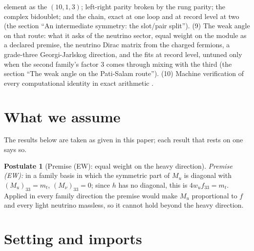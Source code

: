 \documentclass[11pt]{article}
\theoremstyle{definition}
\newtheorem{postulate}[theorem]{Postulate}
\theoremstyle{plain}
\begin{document}
element as the $(10,1,3)$; left-right parity broken by the rung parity; the complex bidoublet; and the chain, exact at one loop and at record level at two (the section ``An intermediate symmetry: the slot/pair split''). (9) The weak angle on that route: what it asks of the neutrino sector, equal weight on the module as a declared premise, the neutrino Dirac matrix from the charged fermions, a grade-three Georgi-Jarlskog direction, and the fits at record level, untuned only when the second family's factor $3$ comes through mixing with the third (the section ``The weak angle on the Pati-Salam route''). (10) Machine verification of every computational identity in exact arithmetic \cite{ButlerVerifyT12}.

\section*{What we assume}
The results below are taken as given in this paper; each result that rests on one says so.
\begin{postulate}[Premise (EW): equal weight on the heavy direction]\label{c:standard-model.premise-ew-equal-weight}
\emph{Premise (EW):} in a family basis in which the symmetric part of $M_{u}$ is diagonal with $(M_{u})_{33} = m_{t}$, $(M_{\nu})_{33} = 0$; since $h$ has no diagonal, this is $4w_{u}f_{33} = m_{t}$. Applied in every family direction the premise would make $M_{u}$ proportional to $f$ and every light neutrino massless, so it cannot hold beyond the heavy direction.
\end{postulate}

\section{Setting and imports}
\end{document}
